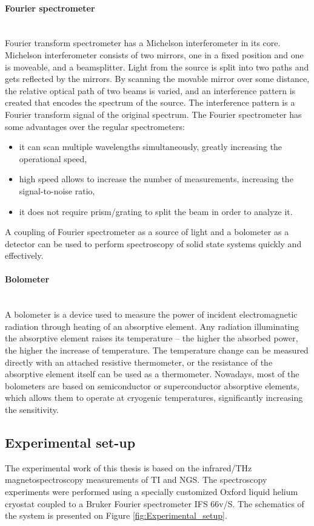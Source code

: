 \documentclass[titlepage,a4paper]{book}
\newcommand{\wciecie}{\quad\phantom{v}}
\newcommand{\myparagraph}[1]{\paragraph{#1}\mbox{}\\}
\begin{document}
\myparagraph{Fourier spectrometer}
\wciecie
Fourier transform spectrometer has a Michelson interferometer in its core. Michelson interferometer consists of two mirrors, one in a fixed position and one is moveable, and a beamsplitter. Light from the source is split into two paths and gets reflected by the mirrors. By scanning the movable mirror over some distance, the relative optical path of two beams is varied, and an interference pattern is created that encodes the spectrum of the source. The interference pattern is a Fourier transform signal of the original spectrum. The Fourier spectrometer has some advantages over the regular spectrometers:
\begin{itemize}
\item it can scan multiple wavelengths simultaneously, greatly increasing the operational speed, 
\item high speed allows to increase the number of measurements, increasing the signal-to-noise ratio,
\item it does not require prism/grating to split the beam in order to analyze it.
\end{itemize}

A coupling of Fourier spectrometer as a source of light and a bolometer as a detector can be used to perform spectroscopy of solid state systems quickly and effectively.

\myparagraph{Bolometer}
\wciecie
A bolometer is a device used to measure the power of incident electromagnetic radiation through heating of an absorptive element. Any radiation illuminating the absorptive element raises its temperature -- the higher the absorbed power, the higher the increase of temperature. The temperature change can be measured directly with an attached resistive thermometer, or the resistance of the absorptive element itself can be used as a thermometer. Nowadays, most of the bolometers are based on semiconductor or superconductor absorptive elements, which allows them to operate at cryogenic temperatures, significantly increasing the sensitivity.

\subsection{Experimental set-up}
\wciecie
The experimental work of this thesis is based on the infrared/THz magnetospectroscopy measurements of TI and NGS. The spectroscopy experiments were performed using a specially customized Oxford liquid helium cryostat coupled to a Bruker Fourier spectrometer IFS 66v/S. The schematics of the system is presented on Figure \ref{fig:Experimental_setup}. 
\end{document}
